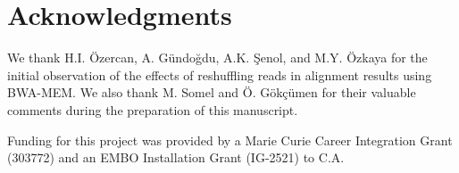 \documentclass[10pt,a4paper]{article}
\begin{document}
\section{Acknowledgments}
We thank H.I. Özercan, A. Gündoğdu, A.K. Şenol, and M.Y. Özkaya for the initial observation of the effects of reshuffling reads in alignment results using BWA-MEM. We also thank M. Somel and Ö. Gökçümen for
their valuable comments during the preparation of this manuscript. 

Funding for this project was provided by a Marie Curie Career Integration Grant (303772) and an 
EMBO Installation Grant (IG-2521) to C.A.

\small






\end{document}
